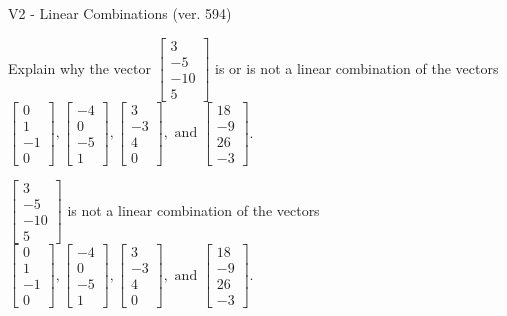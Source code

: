 \begin{exercise}
  \begin{exerciseTitle}V2 - Linear Combinations (ver. 594)\end{exerciseTitle}
  \begin{exerciseStatement}
    Explain why the vector \(\left[\begin{array}{c}
3 \\
-5 \\
-10 \\
5
\end{array}\right]\)  is or is not a linear 
	combination of the vectors \(\left[\begin{array}{c}
0 \\
1 \\
-1 \\
0
\end{array}\right] , \left[\begin{array}{c}
-4 \\
0 \\
-5 \\
1
\end{array}\right] , \left[\begin{array}{c}
3 \\
-3 \\
4 \\
0
\end{array}\right] , \text{ and } \left[\begin{array}{c}
18 \\
-9 \\
26 \\
-3
\end{array}\right]\).
	


  \end{exerciseStatement}
  \begin{exerciseAnswer}
   \(\left[\begin{array}{c}
3 \\
-5 \\
-10 \\
5
\end{array}\right]\) 
  	 is not  
	a linear combination of the vectors \(\left[\begin{array}{c}
0 \\
1 \\
-1 \\
0
\end{array}\right] , \left[\begin{array}{c}
-4 \\
0 \\
-5 \\
1
\end{array}\right] , \left[\begin{array}{c}
3 \\
-3 \\
4 \\
0
\end{array}\right] , \text{ and } \left[\begin{array}{c}
18 \\
-9 \\
26 \\
-3
\end{array}\right]\).


\end{exerciseAnswer}
\end{exercise}
